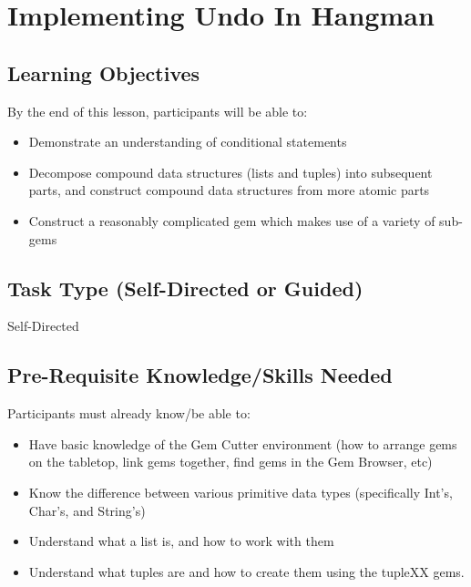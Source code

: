 \section{Implementing Undo In Hangman}

	\subsection*{Learning Objectives}

	By the end of this lesson, participants will be able to:

		\begin{itemize}
			\item Demonstrate an understanding of conditional statements
			\item Decompose compound data structures (lists and tuples) into subsequent parts, and construct compound data structures from more atomic parts
			\item Construct a reasonably complicated gem which makes use of a variety of sub-gems
		\end{itemize}

	\subsection*{Task Type (Self-Directed or Guided)}
	Self-Directed

	\subsection*{Pre-Requisite Knowledge/Skills Needed}

	Participants must already know/be able to:

		\begin{itemize}
			\item Have basic knowledge of the Gem Cutter environment (how to arrange gems on the tabletop, link gems together, find gems in the Gem Browser, etc)
			\item Know the difference between various primitive data types (specifically Int's, Char's, and String's)
			\item Understand what a list is, and how to work with them
			\item Understand what tuples are and how to create them using the tupleXX gems.
		\end{itemize}

